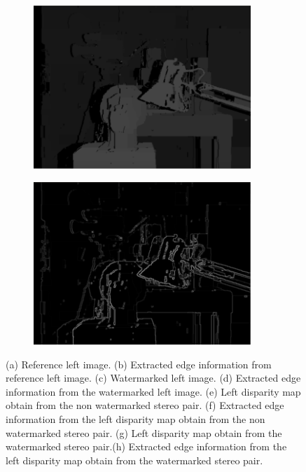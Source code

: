 \begin{figure}[h!]
\begin{subfigure}[]{0.4\textwidth}
\caption{\label{fig:lds}}
\end{subfigure}
\begin{subfigure}[]{0.4\textwidth}
\centering
\includegraphics[width=0.9\textwidth]{./img/rdisp.png}
\caption{\label{fig:rd}}
\end{subfigure}
\begin{subfigure}[]{0.4\textwidth}
\centering
\includegraphics[width=0.9\textwidth]{./img/rdisp_sobel.png}
\caption{\label{rds}}
\end{subfigure}
\caption{\small{(a) Reference left image. (b) Extracted edge information from reference left image. (c) Watermarked left image. (d) Extracted edge information from the watermarked left image. (e) Left disparity map obtain from the non watermarked stereo pair. (f) Extracted edge information from the left disparity map obtain from the non watermarked stereo pair. (g)  Left disparity map obtain from the watermarked stereo pair.(h) Extracted edge information from the left disparity map obtain from the watermarked stereo pair. }\label{fig:sobel}}
\end{figure}
\clearpage

